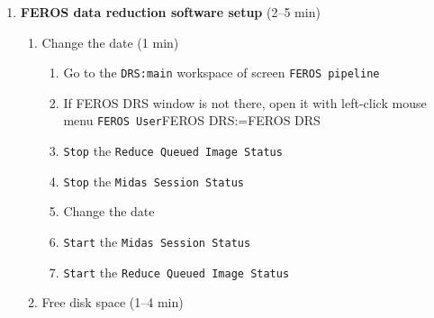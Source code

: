 \documentclass[11pt,fleqn]{book} %
\makeatletter
\def\menu#1#2{\texttt{#1}\ifx{}#2\else\@for\@x:=#2\do{$\rightarrow$\texttt{\@x}}\fi}
\def\mmenu#1#2{left-click mouse menu \menu{#1}{#2}}
\makeatother
\begin{document}
\begin{enumerate}
\begin{enumerate}
\begin{enumerate}
                  \item if it fails go to (3 min)
               \end{enumerate}
           \item Check the \gls{feros} autoguider (1--4 min)
               \begin{enumerate}
                 \item select  below \texttt{CCD change} (see Fig.~\ref{fig:agswitch})
                  \item Use \texttt{Start exposure} to change \texttt{CCD Status} to \texttt{Infinite loop}\\
                  (proceed to troubleshooting (Sect.~\ref{sec:trouble}) if \texttt{CCD Status} is not \texttt{Infinite loop})
                  \item find window \texttt{E2P2 Real Time Display}
                  \item click checkbox \texttt{Camera on/off} so that checkbox gets green
                  \item a bias image should be seen within seconds
                  \item check that the image is horizontally flipped. 
                  \item if it fails go to (3 min)
               \end{enumerate}
        \end{enumerate}           
  \item\textbf{FEROS data reduction software setup} (2--5 min)
    \begin{enumerate}
        \item Change the date  (1 min)
        \label{list:drs}
		\begin{enumerate}
		  \item Go to the \texttt{DRS:main} workspace of screen \texttt{FEROS pipeline}
		  \item If FEROS DRS window is not there, open it with \mmenu{FEROS User}{FEROS DRS}
		  \item \texttt{Stop} the \texttt{Reduce Queued Image Status}
		  \item \texttt{Stop} the \texttt{Midas Session Status}
		  \item Change the date 
		  \item \texttt{Start} the \texttt{Midas Session Status}
		  \item \texttt{Start} the \texttt{Reduce Queued Image Status}
		\end{enumerate}
		\item Free disk space (1--4 min)

\end{enumerate}
\end{enumerate}
\end{document}
